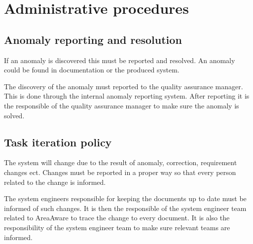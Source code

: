 \chapter{Administrative procedures}
\label{chp:testProcedure}

\section{Anomaly reporting and resolution}
If an anomaly is discovered this must be reported and resolved. An anomaly could be found in documentation or the produced system.

The discovery of the anomaly must reported to the quality assurance manager. This is done through the internal anomaly reporting system. After reporting it is the responsible of the quality assurance manager to make sure the anomaly is solved.

\section{Task iteration policy}
The system will change due to the result of anomaly, correction, requirement changes ect. Changes must be reported in a proper way so that every person related to the change is informed.

The system engineers responsible for keeping the documents up to date must be informed of such changes. It is then the responsible of the system engineer team related to AreaAware to trace the change to every document. It is also the responsibility of the system engineer team to make sure relevant teams are informed.